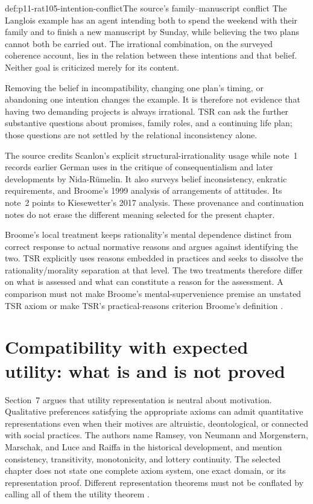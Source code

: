 \begin{hbexample}{def:p11-rat105-intention-conflict}{The source's family--manuscript conflict}
The Langlois example has an agent intending both to spend the weekend
with their family and to finish a new manuscript by Sunday, while
believing the two plans cannot both be carried out. The irrational
combination, on the surveyed coherence account, lies in the relation
between these intentions and that belief. Neither goal is criticized
merely for its content.

Removing the belief in incompatibility, changing one plan's timing, or
abandoning one intention changes the example. It is therefore not
evidence that having two demanding projects is always irrational.
TSR can ask the further substantive questions about promises, family
roles, and a continuing life plan; those questions are not settled by
the relational inconsistency alone.
\end{hbexample}

The source credits Scanlon's explicit structural-irrationality usage
while note~1 records earlier German uses in the critique of
consequentialism and later developments by Nida-R\"umelin. It also
surveys belief inconsistency, enkratic requirements, and Broome's 1999
analysis of arrangements of attitudes. Its note~2 points to Kiesewetter's
2017 analysis. These provenance and continuation notes do not erase the
different meaning selected for the present chapter.

Broome's local treatment keeps rationality's mental dependence distinct
from correct response to actual normative reasons and argues against
identifying the two. TSR explicitly uses reasons embedded in practices
and seeks to dissolve the rationality/morality separation at that level.
The two treatments therefore differ on what is assessed and what can
constitute a reason for the assessment. A comparison must not make
Broome's mental-supervenience premise an unstated TSR axiom or make
TSR's practical-reasons criterion Broome's definition
\parencite[pp.~628--630]{NidaRumelinGutwaldZuber2021}.

\section{Compatibility with expected utility: what is and is not proved}
\label{sec:p11-rat105-ramsey}

Section~7 argues that utility representation is neutral about motivation.
Qualitative preferences satisfying the appropriate axioms can admit
quantitative representations even when their motives are altruistic,
deontological, or connected with social practices. The authors name
Ramsey, von Neumann and Morgenstern, Marschak, and Luce and Raiffa in
the historical development, and mention consistency, transitivity,
monotonicity, and lottery continuity. The selected chapter does not
state one complete axiom system, one exact domain, or its representation
proof. Different representation theorems must not be conflated by
calling all of them the utility theorem
\parencite[pp.~629--630]{NidaRumelinGutwaldZuber2021}.


